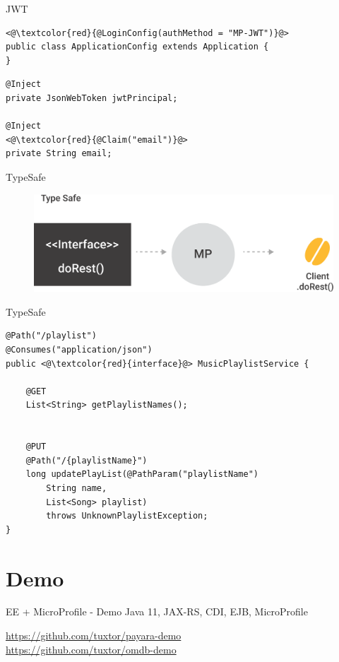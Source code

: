 \documentclass[aspectratio=169]{beamer}
\begin{document}
\begin{frame}[fragile]{JWT}

\begin{lstlisting}
<@\textcolor{red}{@LoginConfig(authMethod = "MP-JWT")}@>
public class ApplicationConfig extends Application {
}
\end{lstlisting}

\begin{lstlisting}
@Inject
private JsonWebToken jwtPrincipal;

@Inject
<@\textcolor{red}{@Claim("email")}@>
private String email;
\end{lstlisting}
\end{frame}

\begin{frame}{TypeSafe}
\begin{figure}
	\centering
	\includegraphics[width=0.75\linewidth]{Images/typesafe}
\end{figure}
\end{frame}

\begin{frame}[fragile]{TypeSafe}


\begin{lstlisting}
@Path("/playlist")
@Consumes("application/json")
public <@\textcolor{red}{interface}@> MusicPlaylistService {

	@GET
	List<String> getPlaylistNames();


	@PUT
	@Path("/{playlistName}")
	long updatePlayList(@PathParam("playlistName")
		String name,
		List<Song> playlist)
		throws UnknownPlaylistException;
}
\end{lstlisting}
\end{frame}


\section{Demo}
\begin{frame}{EE + MicroProfile  - Demo}
\huge Java 11, JAX-RS, CDI, EJB, MicroProfile

\normalsize  \url{https://github.com/tuxtor/payara-demo}\\
\normalsize  \url{https://github.com/tuxtor/omdb-demo}
\end{frame}
\end{document}
